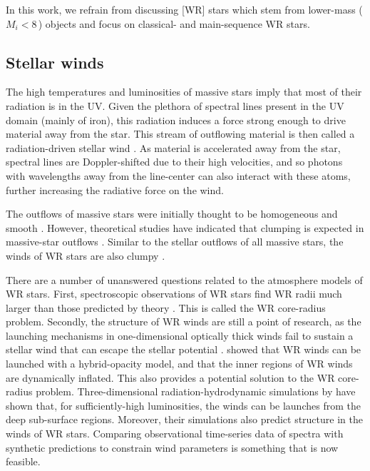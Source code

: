 In this work, we refrain from discussing [WR] stars which stem from lower-mass ($M_i < 8\,$\Msun{}) objects and focus on classical- and main-sequence WR stars.

\subsection{Stellar winds}

The high temperatures and luminosities of massive stars imply that most of their radiation is in the UV. Given the plethora of spectral lines present in the UV domain (mainly of iron), this radiation induces a force strong enough to drive material away from the star. This stream of outflowing material is then called a radiation-driven stellar wind \citep{1970LucySolomon,1975castor}. As material is accelerated away from the star, spectral lines are Doppler-shifted due to their high velocities, and so photons with wavelengths away from the line-center can also interact with these atoms, further increasing the radiative force on the wind.

The outflows of massive stars were initially thought to be homogeneous and smooth \citep{1988deJager,1990Nieuwenhuijzen}. However, theoretical studies have indicated that clumping is expected in massive-star outflows \citep{1988Owocki,2005DessartOwocki,2013SundqvistOwocki,2018Sundqvist,2019A&A...631A.172D}. Similar to the stellar outflows of all massive stars, the winds of WR stars are also clumpy \citep{1991Hillier_clumping_escattering,1998Hamann_clumping,puls_bright_2006,fullerton_discordance_2006}.

There are a number of unanswered questions related to the atmosphere models of WR stars. First, spectroscopic observations of WR stars find WR radii much larger than those predicted by theory \citep{2007Crowther,hamann_galactic_2019,sander_galactic_2019}. This is called the WR core-radius problem. Secondly, the structure of WR winds are still a point of research, as the launching mechanisms in one-dimensional optically thick winds fail to sustain a stellar wind that can escape the stellar potential \citep[e.g.][]{2016Ro_WR_winds,2017Sander_WR_winds}. \citet{2021Poniatowski} showed that WR winds can be launched with a hybrid-opacity model, and that the inner regions of WR winds are dynamically inflated. This also provides a potential solution to the WR core-radius problem. Three-dimensional radiation-hydrodynamic simulations by \citet{2022Moens} have shown that, for sufficiently-high luminosities, the winds can be launches from the deep sub-surface regions. Moreover, their simulations also predict structure in the winds of WR stars. Comparing observational time-series data of spectra \citep[e.g.][]{lepine_wind_2000} with synthetic predictions to constrain wind parameters is something that is now feasible.

